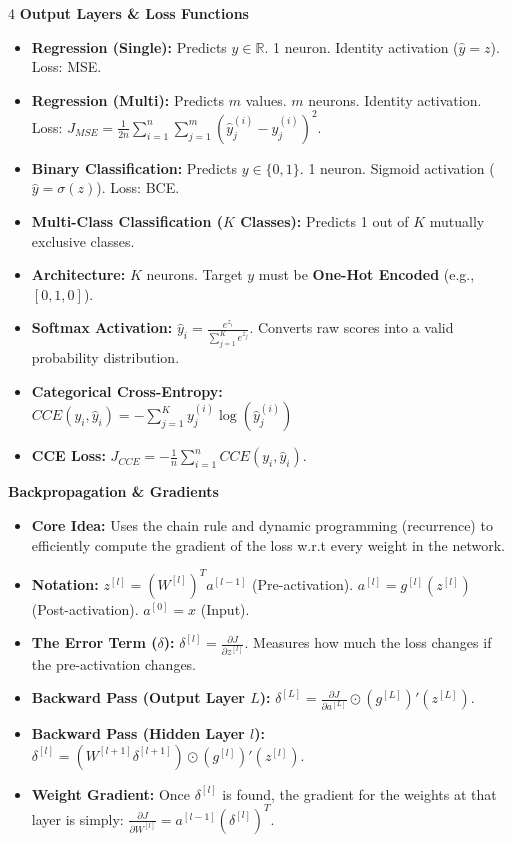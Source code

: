 \documentclass[8pt,landscape,a4paper]{extarticle}
\begin{document}
\begin{multicols*}{4}
\vspace{1mm}
\noindent\textbf{Output Layers \& Loss Functions}
\begin{itemize}[leftmargin=*, nosep]
    \item \textbf{Regression (Single):} Predicts $y \in \mathbb{R}$. 1 neuron. Identity activation ($\hat{y} = z$). Loss: MSE.
    \item \textbf{Regression (Multi):} Predicts $m$ values. $m$ neurons. Identity activation. Loss: $J_{MSE} = \frac{1}{2n}\sum_{i=1}^n \sum_{j=1}^m (\hat{y}_j^{(i)} - y_j^{(i)})^2$.
    \item \textbf{Binary Classification:} Predicts $y \in \{0,1\}$. 1 neuron. Sigmoid activation ($\hat{y} = \sigma(z)$). Loss: BCE.
    \item \textbf{Multi-Class Classification ($K$ Classes):} Predicts 1 out of $K$ mutually exclusive classes. 
    \item \textbf{Architecture:} $K$ neurons. Target $y$ must be \textbf{One-Hot Encoded} (e.g., $[0, 1, 0]$).
    \item \textbf{Softmax Activation:} $\hat{y}_i = \frac{e^{z_i}}{\sum_{j=1}^K e^{z_j}}$. Converts raw scores into a valid probability distribution.
    \item \textbf{Categorical Cross-Entropy:} \\ $CCE(y_i, \hat{y}_i) = -\sum_{j=1}^K y_j^{(i)}\log(\hat{y}_j^{(i)})$
    \item \textbf{CCE Loss:}  $J_{CCE} = -\frac{1}{n} \sum_{i=1}^n CCE(y_i, \hat{y}_i)$.
\end{itemize}

\vspace{1mm}
\noindent\textbf{Backpropagation \& Gradients}
\begin{itemize}[leftmargin=*, nosep]
    \item \textbf{Core Idea:} Uses the chain rule and dynamic programming (recurrence) to efficiently compute the gradient of the loss w.r.t every weight in the network.
    \item \textbf{Notation:} $z^{[l]} = (W^{[l]})^T a^{[l-1]}$ (Pre-activation). $a^{[l]} = g^{[l]}(z^{[l]})$ (Post-activation). $a^{[0]} = x$ (Input).
    \item \textbf{The Error Term ($\delta$):} $\delta^{[l]} = \frac{\partial J}{\partial z^{[l]}}$. Measures how much the loss changes if the pre-activation changes.
    \item \textbf{Backward Pass (Output Layer $L$):} $\delta^{[L]} = \frac{\partial J}{\partial a^{[L]}} \odot (g^{[L]})'(z^{[L]})$.
    \item \textbf{Backward Pass (Hidden Layer $l$):} $\delta^{[l]} = (W^{[l+1]} \delta^{[l+1]}) \odot (g^{[l]})'(z^{[l]})$.
    \item \textbf{Weight Gradient:} Once $\delta^{[l]}$ is found, the gradient for the weights at that layer is simply: $\frac{\partial J}{\partial W^{[l]}} = a^{[l-1]} (\delta^{[l]})^T$.
\end{itemize}


\end{multicols*}
\end{document}
